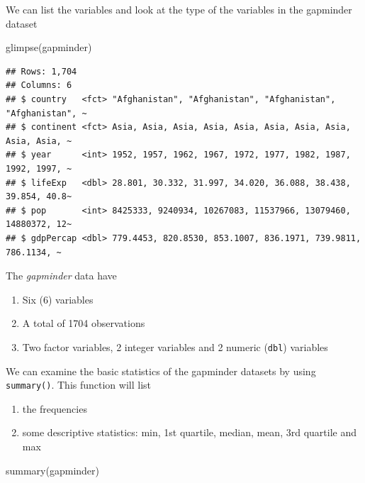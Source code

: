 \documentclass[
  10pt,
]{krantz}
\newenvironment{Shaded}{\begin{snugshade}}{\end{snugshade}}
\newcommand{\FunctionTok}[1]{\textcolor[rgb]{0.00,0.00,0.00}{#1}}
\newcommand{\NormalTok}[1]{#1}
\providecommand{\tightlist}{%
  \setlength{\itemsep}{0pt}\setlength{\parskip}{0pt}}
\begin{document}
We can list the variables and look at the type of the variables in the gapminder dataset

\begin{Shaded}
\begin{Highlighting}[]
\FunctionTok{glimpse}\NormalTok{(gapminder)}
\end{Highlighting}
\end{Shaded}

\begin{verbatim}
## Rows: 1,704
## Columns: 6
## $ country   <fct> "Afghanistan", "Afghanistan", "Afghanistan", "Afghanistan", ~
## $ continent <fct> Asia, Asia, Asia, Asia, Asia, Asia, Asia, Asia, Asia, Asia, ~
## $ year      <int> 1952, 1957, 1962, 1967, 1972, 1977, 1982, 1987, 1992, 1997, ~
## $ lifeExp   <dbl> 28.801, 30.332, 31.997, 34.020, 36.088, 38.438, 39.854, 40.8~
## $ pop       <int> 8425333, 9240934, 10267083, 11537966, 13079460, 14880372, 12~
## $ gdpPercap <dbl> 779.4453, 820.8530, 853.1007, 836.1971, 739.9811, 786.1134, ~
\end{verbatim}

The \emph{gapminder} data have

\begin{enumerate}
\def\labelenumi{\arabic{enumi}.}
\tightlist
\item
  Six (6) variables
\item
  A total of 1704 observations
\item
  Two factor variables, 2 integer variables and 2 numeric (\texttt{dbl}) variables
\end{enumerate}

We can examine the basic statistics of the gapminder datasets by using \texttt{summary()}. This function will list

\begin{enumerate}
\def\labelenumi{\arabic{enumi}.}
\tightlist
\item
  the frequencies
\item
  some descriptive statistics: min, 1st quartile, median, mean, 3rd quartile and max
\end{enumerate}

\begin{Shaded}
\begin{Highlighting}[]
\FunctionTok{summary}\NormalTok{(gapminder)}
\end{Highlighting}
\end{Shaded}
\end{document}
